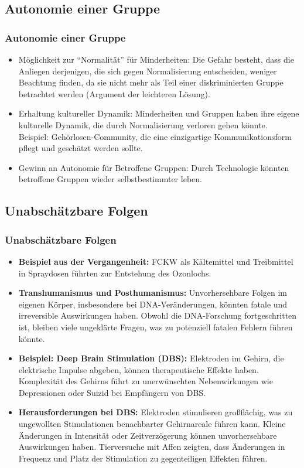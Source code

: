 \documentclass[aspectratio=169,16pt,xcolor=table]{beamer}
\begin{document}
\subsection*{Autonomie einer Gruppe}
\begin{frame}
  \frametitle{Autonomie einer Gruppe}
  \begin{itemize}
    \item Möglichkeit zur ``Normalität'' für Minderheiten: Die Gefahr besteht, dass die Anliegen derjenigen, die sich gegen Normalisierung entscheiden, weniger Beachtung finden, da sie nicht mehr als Teil einer diskriminierten Gruppe betrachtet werden (Argument der leichteren Lösung).
    \item Erhaltung kultureller Dynamik: Minderheiten und Gruppen haben ihre eigene kulturelle Dynamik, die durch Normalisierung verloren gehen könnte. Beispiel: Gehörlosen-Community, die eine einzigartige Kommunikationsform pflegt und geschätzt werden sollte\cite{lee2016cochlear}.
    \item Gewinn an Autonomie für Betroffene Gruppen: Durch Technologie könnten betroffene Gruppen wieder selbstbestimmter leben\cite{das2022locked}.
  \end{itemize}
\end{frame}

\subsection*{Unabschätzbare Folgen}
\begin{frame}
  \frametitle{Unabschätzbare Folgen}
  \begin{itemize}
    \item \textbf{Beispiel aus der Vergangenheit:} FCKW als Kältemittel und Treibmittel in Spraydosen führten zur Entstehung des Ozonlochs\cite{rowland1996stratospheric}.
    \item \textbf{Transhumanismus und Posthumanismus:} Unvorhersehbare Folgen im eigenen Körper, insbesondere bei DNA-Veränderungen, könnten fatale und irreversible Auswirkungen haben. Obwohl die DNA-Forschung fortgeschritten ist, bleiben viele ungeklärte Fragen, was zu potenziell fatalen Fehlern führen könnte.
    \item \textbf{Beispiel: Deep Brain Stimulation (DBS):} Elektroden im Gehirn, die elektrische Impulse abgeben, können therapeutische Effekte haben. Komplexität des Gehirns führt zu unerwünschten Nebenwirkungen wie Depressionen oder Suizid bei Empfängern von DBS\cite{zarzycki2020stimulation}.
    \item \textbf{Herausforderungen bei DBS:} Elektroden stimulieren großflächig, was zu ungewollten Stimulationen benachbarter Gehirnareale führen kann. Kleine Änderungen in Intensität oder Zeitverzögerung können unvorhersehbare Auswirkungen haben\cite{al2021impact}. Tierversuche mit Affen zeigten, dass Änderungen in Frequenz und Platz der Stimulation zu gegenteiligen Effekten führen\cite{logothetis2010effects}.
  \end{itemize}
\end{frame}
\end{document}
